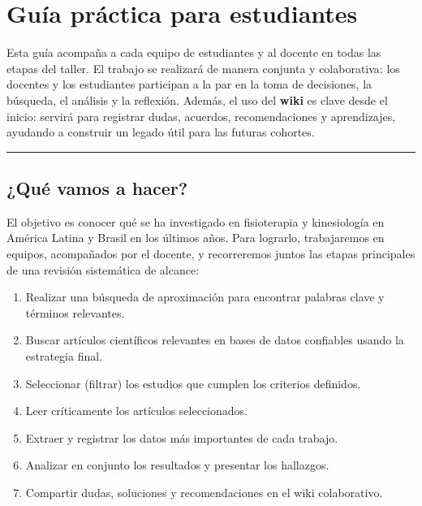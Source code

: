 \documentclass[
  letterpaper,
]{book}
\providecommand{\tightlist}{%
  \setlength{\itemsep}{0pt}\setlength{\parskip}{0pt}}\usepackage{longtable,booktabs,array}
\begin{document}

\chapter{Guía práctica para
estudiantes}\label{guuxeda-pruxe1ctica-para-estudiantes}

Esta guía acompaña a cada equipo de estudiantes y al docente en todas
las etapas del taller. El trabajo se realizará de manera conjunta y
colaborativa: los docentes y los estudiantes participan a la par en la
toma de decisiones, la búsqueda, el análisis y la reflexión. Además, el
uso del \textbf{wiki} es clave desde el inicio: servirá para registrar
dudas, acuerdos, recomendaciones y aprendizajes, ayudando a construir un
legado útil para las futuras cohortes.

\begin{center}\rule{0.5\linewidth}{0.5pt}\end{center}

\section{¿Qué vamos a hacer?}\label{quuxe9-vamos-a-hacer}

El objetivo es conocer qué se ha investigado en fisioterapia y
kinesiología en América Latina y Brasil en los últimos años. Para
lograrlo, trabajaremos en equipos, acompañados por el docente, y
recorreremos juntos las etapas principales de una revisión sistemática
de alcance:

\begin{enumerate}
\def\labelenumi{\arabic{enumi}.}
\tightlist
\item
  Realizar una búsqueda de aproximación para encontrar palabras clave y
  términos relevantes.
\item
  Buscar artículos científicos relevantes en bases de datos confiables
  usando la estrategia final.
\item
  Seleccionar (filtrar) los estudios que cumplen los criterios
  definidos.
\item
  Leer críticamente los artículos seleccionados.
\item
  Extraer y registrar los datos más importantes de cada trabajo.
\item
  Analizar en conjunto los resultados y presentar los hallazgos.
\item
  Compartir dudas, soluciones y recomendaciones en el wiki colaborativo.
\end{enumerate}
\end{document}
